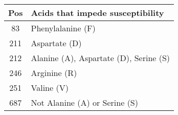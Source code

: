 \begin{table}[ht]
  \centering
  \begin{tabular}[t]{ c | l }
    \hline
    \textbf{Pos} & \textbf{Acids that impede susceptibility} \\
    \hline
    83 & Phenylalanine (F) \\
    211 & Aspartate (D) \\
    212 & Alanine (A), Aspartate (D), Serine (S) \\
    246 & Arginine (R) \\
    251 & Valine (V) \\
    687 & Not Alanine (A) or Serine (S) \\
    \hline
  \end{tabular}
\end{table}